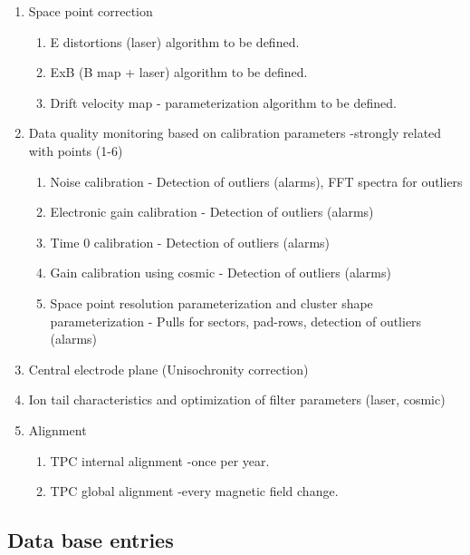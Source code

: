 \documentclass[a4paper,12pt]{article}
\begin{document}
\begin{enumerate}
 \item Space point correction
 \begin{enumerate} 
    \item E distortions (laser) algorithm to be defined.
    \item ExB (B map + laser) algorithm to be defined.
    \item Drift velocity map - parameterization algorithm to be defined.
 \end{enumerate}
 \item Data quality monitoring based on calibration parameters -strongly related with points (1-6)
 \begin{enumerate} 
    \item Noise calibration - Detection of outliers (alarms), FFT spectra for outliers
    \item Electronic gain calibration - Detection  of outliers (alarms)
    \item Time 0 calibration -  	Detection  of outliers (alarms)	
    \item Gain calibration using cosmic - Detection of outliers (alarms)
    \item Space point resolution parameterization and cluster shape parameterization - Pulls for sectors, pad-rows, detection of outliers (alarms)
 \end{enumerate}
 \item Central electrode plane (Unisochronity correction) 
 \item Ion tail characteristics and optimization of filter parameters (laser, cosmic)
 \item Alignment
 \begin{enumerate} 
    \item TPC internal alignment -once per year.
    \item TPC global alignment -every magnetic field change.
 \end{enumerate}
\end{enumerate}



\subsection{Data base entries}
\end{document}
